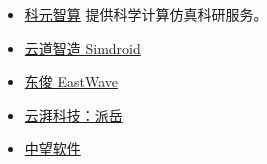 
\begin{itemize}
\item \href{https://www.keyuanzhisuan.com/}{科元智算} 提供科学计算仿真科研服务。
\item \href{https://www.ibe.cn/}{云道智造 Simdroid}
\item \href{https://www.eastfdtd.com/index.aspx}{东俊 EastWave}
\item \href{https://www.yunpaikeji.com.cn/cpfw}{云湃科技：派岳}
\item \href{https://www.zwsoft.cn/product/cae/waves}{中望软件}
\end{itemize}

